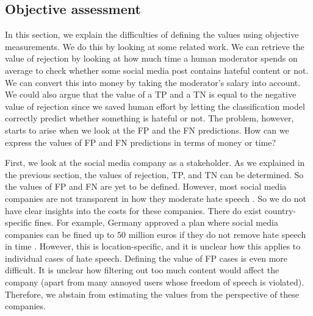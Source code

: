 \subsection{Objective assessment}
In this section, we explain the difficulties of defining the values using objective measurements. We do this by looking at some related work. We can retrieve the value of rejection by looking at how much time a human moderator spends on average to check whether some social media post contains hateful content or not. We can convert this into money by taking the moderator's salary into account. We could also argue that the value of a TP and a TN is equal to the negative value of rejection since we saved human effort by letting the classification model correctly predict whether something is hateful or not. The problem, however, starts to arise when we look at the FP and the FN predictions. How can we express the values of FP and FN predictions in terms of money or time?

First, we look at the social media company as a stakeholder. As we explained in the previous section, the values of rejection, TP, and TN can be determined. So the values of FP and FN are yet to be defined. However, most social media companies are not transparent in how they moderate hate speech \citep{klonick2017new}. So we do not have clear insights into the costs for these companies. There do exist country-specific fines. For example, Germany approved a plan where social media companies can be fined up to 50 million euros if they do not remove hate speech in time \citep{bbc-firms-face-fine-germany}. However, this is location-specific, and it is unclear how this applies to individual cases of hate speech. Defining the value of FP cases is even more difficult. It is unclear how filtering out too much content would affect the company (apart from many annoyed users whose freedom of speech is violated). Therefore, we abstain from estimating the values from the perspective of these companies.

